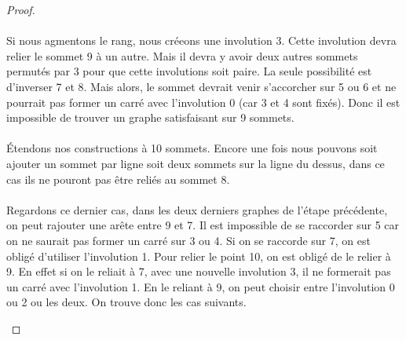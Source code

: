 \begin{proof}
  \paragraph{}
  Si nous agmentons le rang, nous créeons une involution 3. Cette involution devra relier le sommet 9 à un autre. Mais il devra y avoir deux autres sommets permutés par 3 pour que cette involutions soit paire. La seule possibilité est d'inverser 7 et 8. Mais alors, le sommet devrait venir s'accorcher sur 5 ou 6 et ne pourrait pas former un carré avec l'involution 0 (car 3 et 4 sont fixés). Donc il est impossible de trouver un graphe satisfaisant sur 9 sommets.

  \paragraph{}
  Étendons nos constructions à 10 sommets. Encore une fois nous pouvons soit ajouter un sommet par ligne soit deux sommets sur la ligne du dessus, dans ce cas ils ne pouront pas être reliés au sommet 8.

  \paragraph{}
  Regardons ce dernier cas, dans les deux derniers graphes de l'étape précédente, on peut rajouter une arête entre 9 et 7. Il est impossible de se raccorder sur 5 car on ne saurait pas former un carré sur 3 ou 4. Si on se raccorde sur 7, on est obligé d'utiliser l'involution 1. Pour relier le point 10, on est obligé de le relier à 9. En effet si on le reliait à 7, avec une nouvelle involution 3, il ne formerait pas un carré avec l'involution 1. En le reliant à 9, on peut choisir entre l'involution 0 ou 2 ou les deux. On trouve donc les cas suivants.

  \begin{center}
\end{center}
\end{proof}
